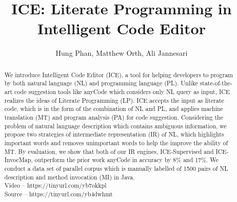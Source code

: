 \documentclass[sigconf,review]{acmart}
\begin{document}
\title{ICE: Literate Programming in Intelligent Code Editor}

\author{Hung Phan, Matthew Orth, Ali Jannesari}


\renewcommand{\shortauthors}{Hung Phan, et al.}
\begin{abstract}
We introduce Intelligent Code Editor (ICE), a tool for helping developers to program by both natural language (NL) and programming language (PL). Unlike state-of-the-art code suggestion tools like anyCode \cite{007} which considers only NL query as input, ICE realizes the ideas of Literate Programming (LP). ICE accepts the input as literate code, which is in the form of the combination of NL and PL, and applies machine translation (MT) and program analysis (PA) for code suggestion. Considering the problem of natural language description which contains ambiguous information, we propose two strategies of intermediate representation (IR) of NL, which highlights important words and removes unimportant words to help the improve the ability of MT. By evaluation, we show that both of our IR engines, ICE-Supervised and ICE-InvocMap, outperform the prior work anyCode in accuracy by 8\% and 17\%. We conduct a data set of parallel corpus which is manually labelled of 1500 pairs of NL description and method invocation (MI) in Java.  
\\
  Video -- https://tinyurl.com/yb7okkpl
  \\
  Source -- https://tinyurl.com/yb4dwhmt
\end{abstract}

\end{document}
